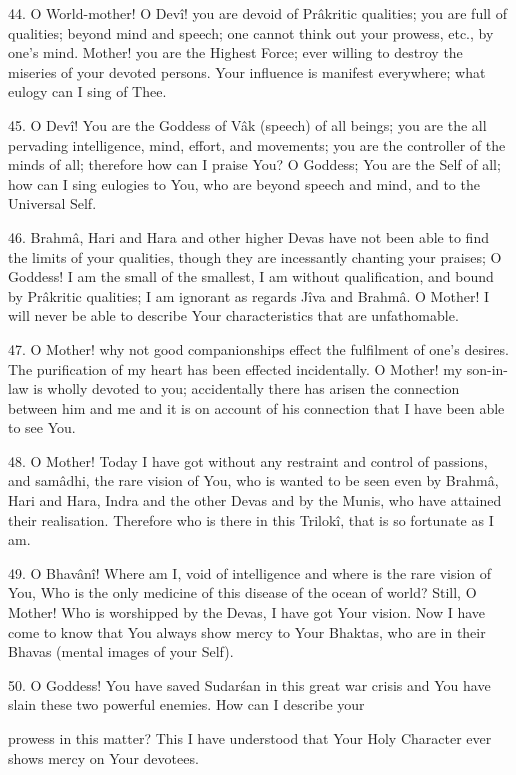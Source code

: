 44. O World-mother! O Dev\^i! you are devoid of Pr\^akritic qualities; you are full of qualities; beyond mind and speech; one cannot think out your prowess, etc., by one's mind. Mother! you are the Highest Force; ever willing to destroy the miseries of your devoted persons. Your influence is manifest everywhere; what eulogy can I sing of Thee.

45. O Dev\^i! You are the Goddess of V\^ak (speech) of all beings; you are the all pervading intelligence, mind, effort, and movements; you are the controller of the minds of all; therefore how can I praise You? O Goddess; You are the Self of all; how can I sing eulogies to You, who are beyond speech and mind, and to the Universal Self.

46. Brahm\^a, Hari and Hara and other higher Devas have not been able to find the limits of your qualities, though they are incessantly chanting your praises; O Goddess! I am the small of the smallest, I am without qualification, and bound by Pr\^akritic qualities; I am ignorant as regards J\^iva and Brahm\^a. O Mother! I will never be able to describe Your characteristics that are unfathomable.

47. O Mother! why not good companionships effect the fulfilment of one's desires. The purification of my heart has been effected incidentally. O Mother! my son-in-law is wholly devoted to you; accidentally there has arisen the connection between him and me and it is on account of his connection that I have been able to see You.

48. O Mother! Today I have got without any restraint and control of passions, and sam\^adhi, the rare vision of You, who is wanted to be seen even by Brahm\^a, Hari and Hara, Indra and the other Devas and by the Munis, who have attained their realisation. Therefore who is there in this Trilok\^i, that is so fortunate as I am.

49. O Bhav\^an\^i! Where am I, void of intelligence and where is the rare vision of You, Who is the only medicine of this disease of the ocean of world? Still, O Mother! Who is worshipped by the Devas, I have got Your vision. Now I have come to know that You always show mercy to Your Bhaktas, who are in their Bhavas (mental images of your Self).

50. O Goddess! You have saved Sudar\'san in this great war crisis and You have slain these two powerful enemies. How can I describe your

prowess in this matter? This I have understood that Your Holy Character ever shows mercy on Your devotees.

